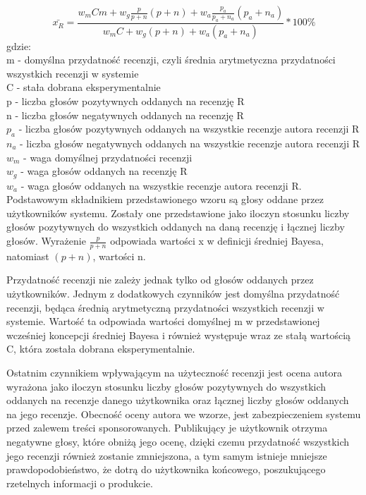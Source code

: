 \begin{equation}
\bar{x_{R}}=\frac{w_{m}Cm+w_{g}\frac{p}{p+n}(p+n)+w_{a}\frac{p_{a}}{p_{a}+n_{a}}(p_{a}+n_{a})}{w_{m}C+w_{g}(p+n)+w_{a}(p_{a}+n_{a})}*100\%
\end{equation}
gdzie:\\
m - domyślna przydatność recenzji, czyli średnia arytmetyczna przydatności wszystkich recenzji w systemie\\
C - stała dobrana eksperymentalnie\\
p - liczba głosów pozytywnych oddanych na recenzję R\\
n - liczba głosów negatywnych oddanych na recenzję R\\
$p_{a}$ - liczba głosów pozytywnych oddanych na wszystkie recenzje autora recenzji R\\
$n_{a}$ - liczba głosów negatywnych oddanych na wszystkie recenzje autora recenzji R\\
$w_{m}$ - waga domyślnej przydatności recenzji\\
$w_{g}$ - waga głosów oddanych na recenzję R\\
$w_{a}$ - waga głosów oddanych na wszystkie recenzje autora recenzji R.\\


Podstawowym składnikiem przedstawionego wzoru są głosy oddane przez użytkowników systemu. Zostały one przedstawione jako iloczyn stosunku liczby głosów pozytywnych do wszystkich oddanych na daną recenzję i łącznej liczby głosów. Wyrażenie $\frac{p}{p+n}$ odpowiada wartości x w definicji średniej Bayesa, natomiast $(p + n)$, wartości n.

Przydatność recenzji nie zależy jednak tylko od głosów oddanych przez użytkowników. Jednym z dodatkowych czynników jest domyślna przydatność recenzji, będąca średnią arytmetyczną przydatności wszystkich recenzji w systemie. Wartość ta odpowiada wartości domyślnej m w przedstawionej wcześniej koncepcji średniej Bayesa i również występuje wraz ze stałą wartością C, która została dobrana eksperymentalnie.

Ostatnim czynnikiem wpływającym na użyteczność recenzji jest ocena autora wyrażona jako iloczyn stosunku liczby głosów pozytywnych do wszystkich oddanych na recenzje danego użytkownika oraz łącznej liczby głosów oddanych na jego recenzje. Obecność oceny autora we wzorze, jest zabezpieczeniem systemu przed zalewem treści sponsorowanych. Publikujący je użytkownik otrzyma negatywne głosy, które obniżą jego ocenę, dzięki czemu przydatność wszystkich jego recenzji również zostanie zmniejszona, a tym samym istnieje mniejsze prawdopodobieństwo, że dotrą do użytkownika końcowego, poszukującego rzetelnych informacji o produkcie. 

